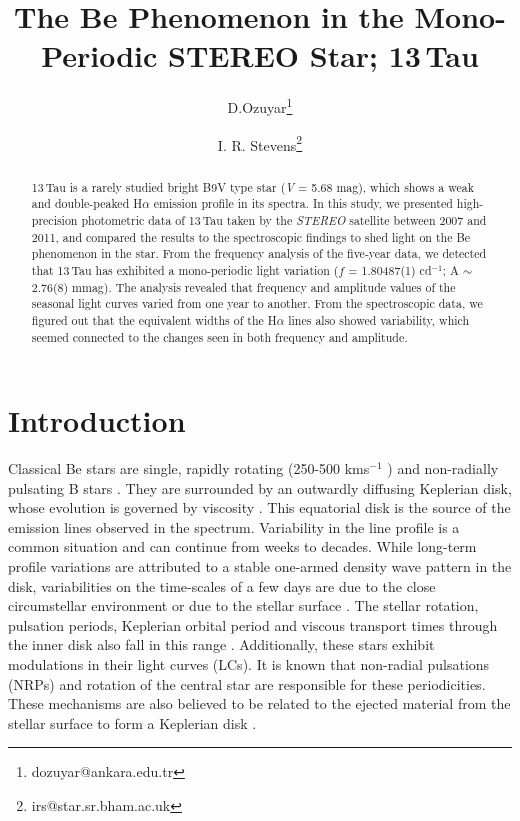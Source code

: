 \documentclass[]{article}
\title{The Be Phenomenon in the Mono-Periodic STEREO Star; 13\,Tau}
\author[1,2]{D.Ozuyar\thanks{dozuyar@ankara.edu.tr}}
\author[2]{I. R. Stevens\thanks{irs@star.sr.bham.ac.uk}}
\affil[1]{Ankara University, Astronomy and Space Sci. Dept., Tandogan, Ankara, 06100, Turkey}
\affil[2]{The University of Birmingham, School of Physics and Astronomy, Birmingham, B15 2TT, UK}
\begin{document}
\maketitle

\begin{abstract}
13\,Tau is a rarely studied bright B9V type star ({\sl V} = 5.68 mag), which shows a weak and double-peaked H{$\alpha$} emission profile in its spectra. In this study, we presented high-precision photometric data of 13\,Tau taken by the {\sl STEREO} satellite between 2007 and 2011, and compared the results to the spectroscopic findings to shed light on the Be phenomenon in the star. From the frequency analysis of the five-year data, we detected that 13\,Tau has exhibited a mono-periodic light variation ($f$ = 1.80487(1) cd$^{-1}$; A $\sim$ 2.76(8) mmag). The analysis revealed that frequency and amplitude values of the seasonal light curves varied from one year to another. From the spectroscopic data, we figured out that the equivalent widths of the H{$\alpha$} lines also showed variability, which seemed connected to the changes seen in both frequency and amplitude. 
\end{abstract}


\section{Introduction}


Classical Be stars are single, rapidly rotating (250-500 kms$^{-1}$ \cite{Struve1931}) and non-radially pulsating B stars \cite{rivinius2013}. They are surrounded by an outwardly diffusing Keplerian disk, whose evolution is governed by viscosity \cite{rivinius2016}. This equatorial disk is the source of the emission lines observed in the spectrum. Variability in the line profile is a common situation and can continue from weeks to decades. While long-term profile variations are attributed to a stable one-armed density wave pattern in the disk, variabilities on the time-scales of a few days are due to the close circumstellar environment or due to the stellar surface \cite{rivinius2013}. The stellar rotation, pulsation periods, Keplerian orbital period and viscous transport times through the inner disk also fall in this range \cite{rivinius2013}. Additionally, these stars exhibit modulations in their light curves (LCs). It is known that non-radial pulsations (NRPs) and rotation of the central star are responsible for these periodicities. These mechanisms are also believed to be related to the ejected material from the stellar surface to form a Keplerian disk \cite{rivinius2016}.
\end{document}
